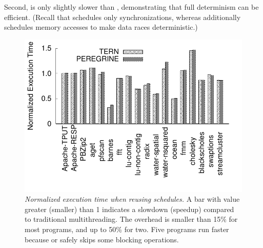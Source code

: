 Second, \tern is only slightly slower than \tern,
demonstrating that full determinism can be efficient.  (Recall that
\tern schedules only synchronizations, whereas \tern additionally
schedules memory accesses to make data races
deterministic.)

\begin{figure}[t]
\centering
\includegraphics[width=.8\columnwidth]{tern/figures/overhead}
\vspace{-.3in}
\caption{{\em Normalized execution time when reusing schedules.}  A bar
  with value greater (smaller) than 1 indicates a slowdown (speedup)
  compared to traditional multithreading.  The overhead is smaller than
  15\% for most programs, and up to 50\% for two.  Five programs run
  faster because \tern or \tern safely skips some blocking
  operations.} \label{fig:overhead}
\vspace{-.05in}
\end{figure}

